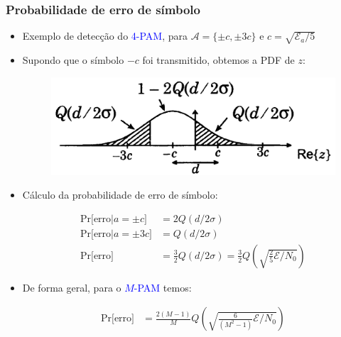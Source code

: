 \begin{frame}
	\frametitle{Probabilidade de erro de símbolo}

	\begin{itemize}
	    \item Exemplo de detecção do \textcolor{blue}{4-PAM}, para $\mathcal{A}=\{\pm c, \pm 3c \}$ e $c=\sqrt{\mathcal{E}_a/5}$
	    \item Supondo que o símbolo $-c$ foi transmitido, obtemos a PDF de $z$:
	    \begin{figure}[t]	
	      \begin{center}
		\includegraphics[width=0.43\columnwidth]{figs/pam_44}
	      \end{center}
	    \end{figure}
	    \item Cálculo da probabilidade de erro de símbolo:
	    \begin{footnotesize}
	    \begin{align*}
		    \text{Pr[erro}|a=\pm c] &= 2Q(d/2\sigma) \\
		    \text{Pr[erro}|a=\pm 3c] &= Q(d/2\sigma) \\
		    \mathrm{Pr}\text{[erro]} &= \frac{3}{2}Q(d/2\sigma) = \frac{3}{2}Q\left(\sqrt{\frac{2}{5}\mathcal{E}/N_0}\right)
	    \end{align*}
	    \end{footnotesize}
	    \item De forma geral, para o \textcolor{blue}{$M$-PAM} temos:
	    \begin{footnotesize}
	    \begin{align*}
		    \mathrm{Pr}\text{[erro]} &= \frac{2(M-1)}{M}Q\left(\sqrt{\frac{6}{(M^2-1)}\mathcal{E}/N_0}\right)
	    \end{align*}
	    \end{footnotesize}
	\end{itemize}	
\end{frame}

